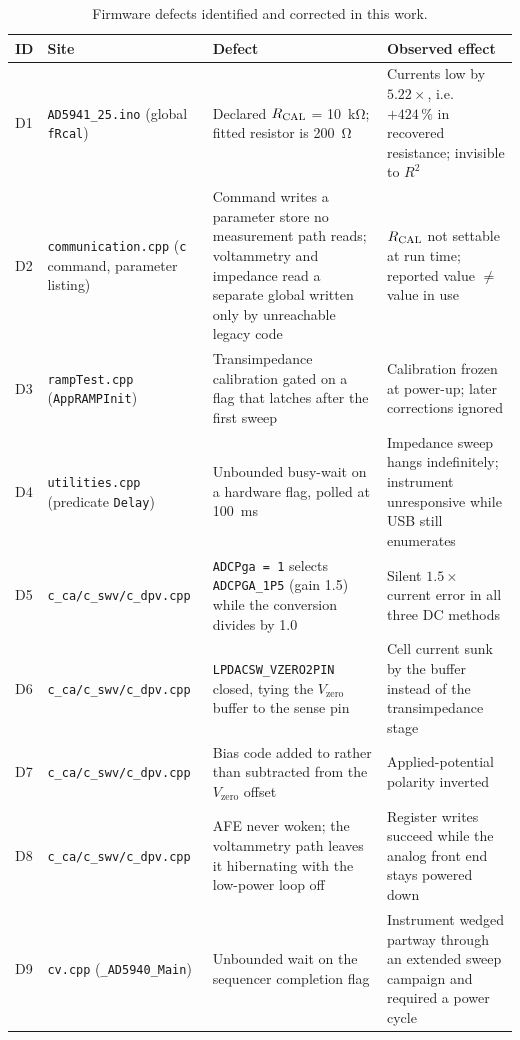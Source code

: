 \begin{table}[!t]
\caption{Firmware defects identified and corrected in this work.}
\label{tab:defects}
\centering
\footnotesize
\setlength{\tabcolsep}{4pt}
\begin{tabular}{@{}l >{\raggedright\arraybackslash}p{3.1cm} >{\raggedright\arraybackslash}p{4.2cm} >{\raggedright\arraybackslash}p{4.0cm}@{}}
\toprule
\textbf{ID} & \textbf{Site} & \textbf{Defect} & \textbf{Observed effect} \\
\midrule
D1 & \texttt{AD5941\_25.ino} (global \texttt{fRcal}) & Declared $R_{\mathrm{CAL}}$ = \SI{10}{\kilo\ohm}; fitted resistor is \SI{200}{\ohm} & Currents low by $5.22\times$, i.e.\ $+424\,\%$ in recovered resistance; invisible to $R^{2}$ \\
D2 & \texttt{communication.cpp} (\texttt{c} command, parameter listing) & Command writes a parameter store no measurement path reads; voltammetry and impedance read a separate global written only by unreachable legacy code & $R_{\mathrm{CAL}}$ not settable at run time; reported value $\neq$ value in use \\
D3 & \texttt{rampTest.cpp} (\texttt{AppRAMPInit}) & Transimpedance calibration gated on a flag that latches after the first sweep & Calibration frozen at power-up; later corrections ignored \\
D4 & \texttt{utilities.cpp} (predicate \texttt{Delay}) & Unbounded busy-wait on a hardware flag, polled at \SI{100}{\milli\second} & Impedance sweep hangs indefinitely; instrument unresponsive while USB still enumerates \\
D5 & \texttt{c\_ca/c\_swv/c\_dpv.cpp} & \texttt{ADCPga = 1} selects \texttt{ADCPGA\_1P5} (gain 1.5) while the conversion divides by 1.0 & Silent $1.5\times$ current error in all three DC methods \\
D6 & \texttt{c\_ca/c\_swv/c\_dpv.cpp} & \texttt{LPDACSW\_VZERO2PIN} closed, tying the $V_{\mathrm{zero}}$ buffer to the sense pin & Cell current sunk by the buffer instead of the transimpedance stage \\
D7 & \texttt{c\_ca/c\_swv/c\_dpv.cpp} & Bias code added to rather than subtracted from the $V_{\mathrm{zero}}$ offset & Applied-potential polarity inverted \\
D8 & \texttt{c\_ca/c\_swv/c\_dpv.cpp} & AFE never woken; the voltammetry path leaves it hibernating with the low-power loop off & Register writes succeed while the analog front end stays powered down \\
\midrule
D9 & \texttt{cv.cpp} (\texttt{\_AD5940\_Main}) & Unbounded wait on the sequencer completion flag & Instrument wedged partway through an extended sweep campaign and required a power cycle \\

\end{tabular}
\end{table}
